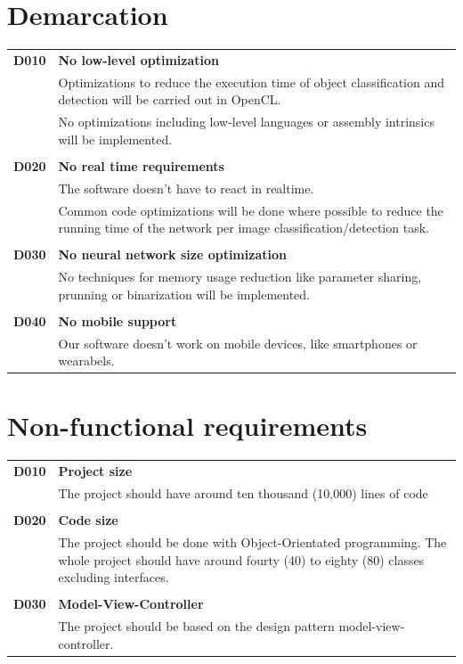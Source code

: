 \documentclass[parskip=full]{scrartcl}
\begin{document}
\section{Demarcation}
\begin{tabular}{p{2cm}p{12cm}}
\textbf{D010} & \textbf{No low-level optimization}\\
& Optimizations to reduce the execution time of object classification and detection will  be carried out in OpenCL.\\
& No optimizations including low-level languages or assembly intrinsics will be implemented.\\
&\\
\textbf{D020} & \textbf{No real time requirements}\\
& The software doesn't have to react in realtime. \\
& Common code optimizations will be done where possible to reduce the running time of the network per image classification/detection task.\\
&\\
\textbf{D030} & \textbf{No neural network size optimization}\\
&No techniques for memory usage reduction like parameter sharing, prunning or binarization will be implemented.\\
&\\
\textbf{D040} & \textbf{No mobile support}\\
& Our software doesn't work on mobile devices, like smartphones or wearabels.
\end{tabular}

\section{Non-functional requirements}
\begin{tabular}{p{2cm}p{12cm}}
\textbf{D010} & \textbf{Project size}\\
& The project should have around ten thousand (10,000) lines of code \\
& \\
\textbf{D020} & \textbf{Code size}\\
& The project should be done with Object-Orientated programming. The whole project should have around fourty (40) to eighty (80) classes excluding interfaces. \\
& \\
\textbf{D030} & \textbf{Model-View-Controller}\\
& The project should be based on the design pattern model-view-controller. \\
\end{tabular}
\end{document}
